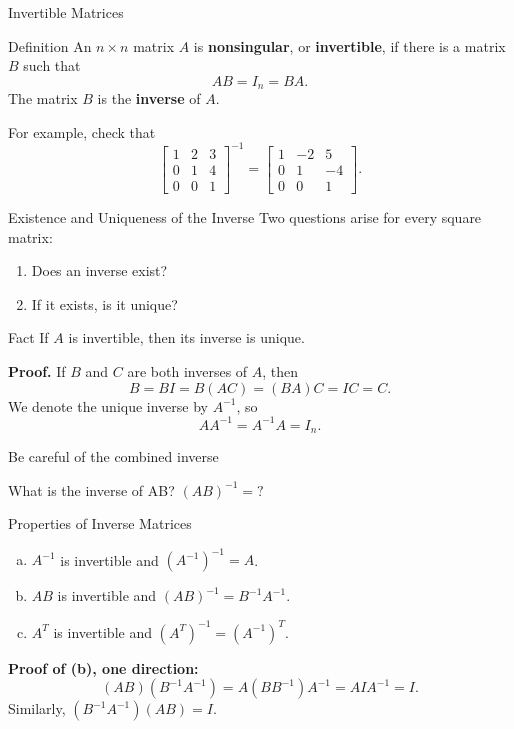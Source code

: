\begin{frame}{Invertible Matrices}
\begin{block}{Definition}
An $n\times n$ matrix $A$ is \textbf{nonsingular}, or \textbf{invertible}, if there is a matrix $B$ such that
\[
AB=I_n=BA.
\]
The matrix $B$ is the \textbf{inverse} of $A$.
\end{block}
\medskip
For example, check that
\[
\begin{bmatrix}1&2&3\\0&1&4\\0&0&1\end{bmatrix}^{-1}
=
\begin{bmatrix}1&-2&5\\0&1&-4\\0&0&1\end{bmatrix}.
\]
\end{frame}

\begin{frame}{Existence and Uniqueness of the Inverse}
Two questions arise for every square matrix:
\begin{enumerate}
  \item Does an inverse exist?
  \item If it exists, is it unique?
\end{enumerate}
\begin{block}{Fact}
If $A$ is invertible, then its inverse is unique.
\end{block}
\textbf{Proof.} If $B$ and $C$ are both inverses of $A$, then
\[
B=BI=B(AC)=(BA)C=IC=C.
\]
We denote the unique inverse by $A^{-1}$, so
\[
AA^{-1}=A^{-1}A=I_n.
\]
\end{frame}


\begin{frame}{Be careful of the combined inverse}
  \begin{alertblock}{What is the inverse of AB?}
    $(AB)^{-1}=?$
  \end{alertblock}
\end{frame}

\begin{frame}{Properties of Inverse Matrices}
\begin{enumerate}[a.]
  \item $A^{-1}$ is invertible and $(A^{-1})^{-1}=A$.
  \item $AB$ is invertible and $(AB)^{-1}=B^{-1}A^{-1}$.
  \item $A^T$ is invertible and $(A^T)^{-1}=(A^{-1})^T$.
\end{enumerate}
\medskip
\textbf{Proof of (b), one direction:}
\[
(AB)(B^{-1}A^{-1})
=A(BB^{-1})A^{-1}
=AIA^{-1}=I.
\]
Similarly, $(B^{-1}A^{-1})(AB)=I$.
\end{frame}

